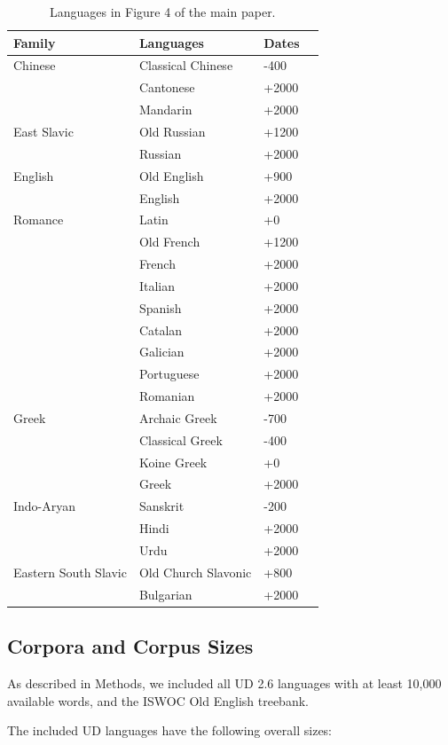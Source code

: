 \documentclass[11pt,a4paper]{article}
\begin{document}
\begin{table}
\begin{tabular}{llll} \hline
Family & Languages & Dates \\ \hline\hline
Chinese & Classical Chinese & -400  \\
& Cantonese & +2000\\ 
& Mandarin & +2000 \\ \hline
East Slavic & Old Russian & +1200 \\
& Russian & +2000 \\ \hline
English & Old English & +900 \\
& English  & +2000\\ \hline
Romance & Latin &+0  \\
& Old French &+1200\\
& French  & +2000\\
& Italian & +2000\\
& Spanish & +2000\\
& Catalan & +2000\\
& Galician & +2000\\
& Portuguese & +2000\\
& Romanian & +2000\\ \hline
Greek & Archaic Greek & -700 \\
      & Classical Greek & -400 \\
      & Koine Greek & +0\\
& Greek  & +2000\\ \hline
Indo-Aryan & Sanskrit & -200 \\
& Hindi  & +2000\\
& Urdu  & +2000\\ \hline
Eastern South Slavic & Old Church Slavonic & +800 \\
& Bulgarian  & +2000\\ \hline
\end{tabular}
	\caption{Languages in Figure 4 of the main paper.}
\end{table}

\subsection{Corpora and Corpus Sizes}

As described in Methods, we included all UD 2.6 languages with at least 10,000 available words, and the ISWOC Old English treebank.

The included UD languages have the following overall sizes:
\end{document}
